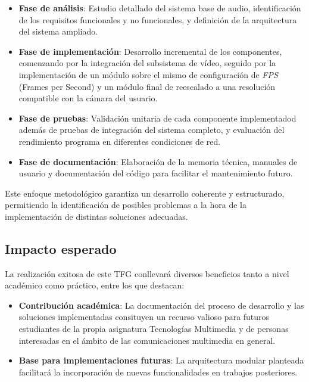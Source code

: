 \begin{itemize}
    
    \item \textbf{Fase de análisis}: Estudio detallado del sistema base de audio, identificación de los requisitos funcionales y no funcionales, y definición de la arquitectura del sistema ampliado.
    
    \item \textbf{Fase de implementación}: Desarrollo incremental de los componentes, comenzando por la integración del subsistema de vídeo, seguido por la implementación de un módulo sobre el mismo de configuración de \textit{FPS} (Frames per Second) y un módulo final de reescalado a una resolución compatible con la cámara del usuario.
    
    \item \textbf{Fase de pruebas}: Validación unitaria de cada componente implementadod además de pruebas de integración del sistema completo, y evaluación del rendimiento programa en diferentes condiciones de red.
    
    \item \textbf{Fase de documentación}: Elaboración de la memoria técnica, manuales de usuario y documentación del código para facilitar el mantenimiento futuro.
\end{itemize}
\vspace{\baselineskip}
Este enfoque metodológico garantiza un desarrollo coherente y estructurado, permitiendo la identificación de posibles problemas a la hora de la implementación de distintas soluciones adecuadas.

\subsection{Impacto esperado}

La realización exitosa de este TFG conllevará diversos beneficios tanto a nivel académico como práctico, entre los que destacan:

\begin{itemize}

    \item \textbf{Contribución académica}: La documentación del proceso de desarrollo y las soluciones implementadas consituyen un recurso valioso para futuros estudiantes de la propia asignatura Tecnologías Multimedia y de personas interesadas en el ámbito de las comunicaciones multimedia en general.
    
    \item \textbf{Base para implementaciones futuras}: La arquitectura modular planteada facilitará la incorporación de nuevas funcionalidades en trabajos posteriores.
\end{itemize}